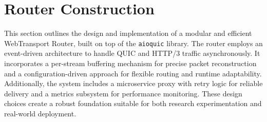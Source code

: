 


\section{Router Construction}
This section outlines the design and implementation of a modular and efficient WebTransport Router, built on top of the \texttt{aioquic} library. The router employs an event-driven architecture to handle QUIC and HTTP/3 traffic asynchronously. It incorporates a per-stream buffering mechanism for precise packet reconstruction and a configuration-driven approach for flexible routing and runtime adaptability. Additionally, the system includes a microservice proxy with retry logic for reliable delivery and a metrics subsystem for performance monitoring. These design choices create a robust foundation suitable for both research experimentation and real-world deployment.

